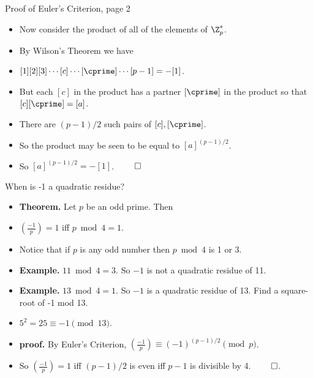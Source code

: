 \documentclass[handout]{beamer}
\begin{document}
\begin{frame}{Proof of Euler's Criterion, page 2}

\begin{itemize}
  \item Now consider the product of all of the elements of $\Z^*_p$.
  \item By Wilson's Theorem we have
  \item $[1][2][3]\cdots[c]\cdots[\cprime]\cdots[p-1] = -[1]$.
  \item But each $[c]$ in the product has a partner $[\cprime]$ in the product
  so that $[c][\cprime] = [a]$.
  \item There are $(p-1)/2$ such pairs of $[c], [\cprime]$.
  \item So the product may be seen to be equal to $[a]^{(p-1)/2}$.
  \item So $[a]^{(p-1)/2}= -[1]$. $\qed$
\end{itemize}

\end{frame}

\begin{frame}{When is -1 a quadratic residue?}

\begin{itemize}
  \item \textbf{Theorem.}  Let $p$ be an odd prime. Then
  \item $(\frac{-1}{p}) = 1$ iff $p\bmod 4 = 1$.
  \item Notice that if $p$ is any odd number then $p \bmod 4$ is 1 or 3.
  \item \textbf{Example.} $11\bmod 4 = 3$. So $-1$ is not a quadratic residue of 11.
  \item \textbf{Example.} $13\bmod 4 = 1$. So $-1$ is a quadratic residue of 13. Find a square-root of -1 mod 13.
  \item $5^2 = 25 \equiv -1 \pmod {13}$.
  \item \textbf{proof.} By Euler's Criterion, $(\frac{-1}{p}) \equiv (-1)^{(p-1)/2} \pmod p$.
  \item So $(\frac{-1}{p}) = 1$ iff $(p-1)/2$ is even iff $p-1$ is divisible by 4. $\qed$.
\end{itemize}

\end{frame}
\end{document}
